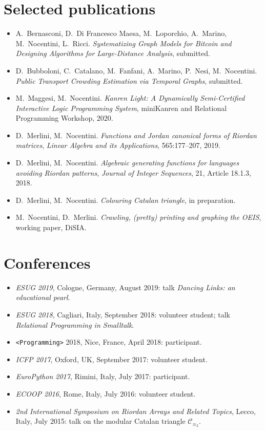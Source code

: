 \documentclass[11pt,a4paper]{article}
\begin{document}
\section*{Selected publications}

\begin{itemize}[leftmargin=1.4em,itemsep=0.3em]
\item A.\ Bernasconi, D.\ Di Francesco Maesa, M.\ Loporchio, A.\ Marino, M.\ Nocentini, L.\ Ricci. \emph{Systematizing Graph Models for Bitcoin and Designing Algorithms for Large-Distance Analysis}, submitted.
\item D.\ Bubboloni, C.\ Catalano, M.\ Fanfani, A.\ Marino, P.\ Nesi, M.\ Nocentini. \emph{Public Transport Crowding Estimation via Temporal Graphs}, submitted.
\item M.\ Maggesi, M.\ Nocentini. \emph{Kanren Light: A Dynamically Semi-Certified Interactive Logic Programming System}, miniKanren and Relational Programming Workshop, 2020.
\item D.\ Merlini, M.\ Nocentini. \emph{Functions and Jordan canonical forms of Riordan matrices}, \emph{Linear Algebra and its Applications}, 565:177--207, 2019.
\item D.\ Merlini, M.\ Nocentini. \emph{Algebraic generating functions for languages avoiding Riordan patterns}, \emph{Journal of Integer Sequences}, 21, Article 18.1.3, 2018.
\item D.\ Merlini, M.\ Nocentini. \emph{Colouring Catalan triangle}, in preparation.
\item M.\ Nocentini, D.\ Merlini. \emph{Crawling, (pretty) printing and graphing the OEIS}, working paper, DiSIA.
\end{itemize}

\section*{Conferences}

\begin{itemize}[leftmargin=1.4em,itemsep=0.3em]
\item \emph{ESUG 2019}, Cologne, Germany, August 2019: talk \emph{Dancing Links: an educational pearl}.
\item \emph{ESUG 2018}, Cagliari, Italy, September 2018: volunteer student; talk \emph{Relational Programming in Smalltalk}.
\item \texttt{<Programming>} 2018, Nice, France, April 2018: participant.
\item \emph{ICFP 2017}, Oxford, UK, September 2017: volunteer student.
\item \emph{EuroPython 2017}, Rimini, Italy, July 2017: participant.
\item \emph{ECOOP 2016}, Rome, Italy, July 2016: volunteer student.
\item \emph{2nd International Symposium on Riordan Arrays and Related Topics}, Lecco, Italy, July 2015: talk on the modular Catalan triangle $\mathcal{C}_{\equiv_2}$.
\end{itemize}
\end{document}
